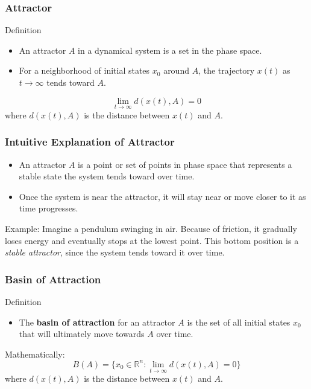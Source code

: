 \documentclass{beamer}
\begin{document}
\begin{frame}
    \frametitle{Attractor}

	\begin{block}{Definition}
    \begin{itemize}
        \item An attractor \( A \) in a dynamical system is a set in the phase space.
        \item For a neighborhood of initial states \( x_0 \) around \( A \), the trajectory \( x(t) \) as \( t \to \infty \) tends toward \( A \).
    \end{itemize}
    
    \[
    \lim_{t \to \infty} d(x(t), A) = 0
    \]
    where \( d(x(t), A) \) is the distance between \( x(t) \) and \( A \).
\end{block}
\end{frame}

\begin{frame}
    \frametitle{Intuitive Explanation of Attractor}

    \begin{itemize}
        \item An attractor  \( A \) is a point or set of points in phase space that represents a stable state the system tends toward over time.
        \item Once the system is near the attractor, it will stay near or move closer to it as time progresses.
    \end{itemize}
    
    \bigskip
    Example: Imagine a pendulum swinging in air. Because of friction, it gradually loses energy and eventually stops at the lowest point. This bottom position is a \emph{stable attractor}, since the system tends toward it over time.
\end{frame}

\begin{frame}
    \frametitle{Basin of Attraction}

    \begin{block}{Definition}
    \begin{itemize}
        \item The \textbf{basin of attraction} for an attractor \( A \) is the set of all initial states \( x_0 \) that will ultimately move towards \( A \) over time.
    \end{itemize}

    Mathematically:
    \[
    B(A) = \{ x_0 \in \mathbb{R}^n : \lim_{t \to \infty} d(x(t), A) = 0 \}
    \]
    where \( d(x(t), A) \) is the distance between \( x(t) \) and \( A \).
\end{block}
\end{frame}
\end{document}
